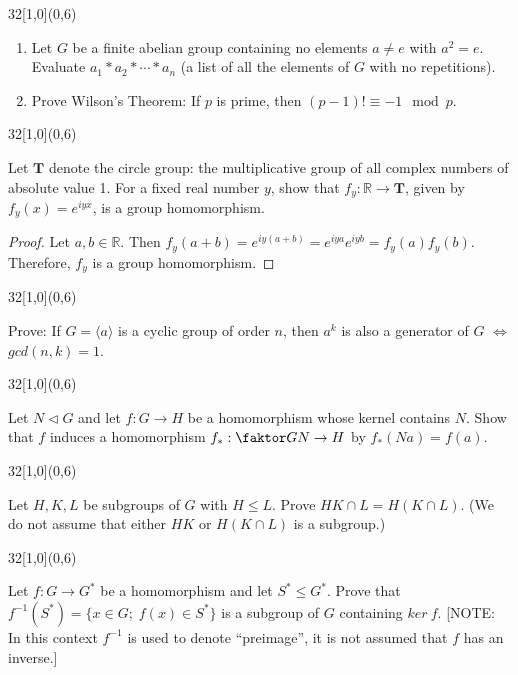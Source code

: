 \documentclass[12pt]{article}
\newenvironment{exercise}[2]{\begin{textblock}{32}[1,0](0,#2)\noindent#1\end{textblock}}{\vspace{1in}}
\begin{document}
\begin{exercise}{1.27}{6}
  \begin{enumerate}[(i.)]
  	\item Let $G$ be a finite abelian group containing no elements $a\ne e$ with $a^2=e$. Evaluate $a_1*a_2*\dotsb*a_n$ (a list of all the elements of $G$ with no repetitions).
    \item Prove Wilson's Theorem: If $p$ is prime, then $(p-1)!\equiv -1\mod p$.
  \end{enumerate}
\end{exercise}

\begin{exercise}{1.46}{6}
  {\noindent}Let $\boldsymbol{T}$ denote the circle group: the multiplicative group of all complex numbers of absolute value 1. For a fixed real number $y$, show that $f_y:\mathbb{R}\to \boldsymbol{T}$, given by $f_y(x)=e^{iyx}$, is a group homomorphism.

  \begin{proof}
    Let $a,b\in\mathbb{R}$. Then $f_y(a+b)=e^{iy(a+b)}=e^{iya}e^{iyb}=f_y(a)f_y(b)$.\\
    Therefore, $f_y$ is a group homomorphism.
  \end{proof}
\end{exercise}

\begin{exercise}{2.20}{6}
	{\noindent}Prove: If $G=\langle a \rangle$ is a cyclic group of order $n$, then $a^k$ is also a generator of $G$ $\iff$ $gcd(n,k)=1$.
\end{exercise}

\begin{exercise}{2.46}{6}
	{\noindent}Let $N\vartriangleleft G$ and let $f: G\to H$  be a homomorphism whose kernel contains $N$. Show that $f$ induces a homomorphism $f_*:\faktor GN\to H$ by $f_*(Na)=f(a)$.
\end{exercise}

\begin{exercise}{2.49}{6}
	{\noindent}Let $H,K,L$ be subgroups of $G$ with $H\le L$. Prove $HK\cap L=H(K\cap L)$. (We do not assume that either $HK$ or $H(K\cap L)$ is a subgroup.)
\end{exercise}

\begin{exercise}{2.50}{6}
	{\noindent}Let $f: G\to G^*$ be a homomorphism and let $S^*\le G^*$. Prove that $f^{-1}(S^*)=\{ x\in G;\; f(x)\in S^*\}$ is a subgroup of $G$ containing $ker\ f$. [NOTE: In this context $f^{-1}$ is used to denote ``preimage'', it is not assumed that $f$ has an inverse.]
\end{exercise}
\end{document}

